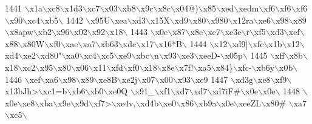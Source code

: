 \begin{DoxyCode}
1441 \textcolor{stringliteral}{\(\backslash\)x1a\(\backslash\)xc8\(\backslash\)x1d3\(\backslash\)xc7\(\backslash\)x03\(\backslash\)xb8\(\backslash\)x9c\(\backslash\)x8c\(\backslash\)x04@)\(\backslash\)x85\(\backslash\)xed\(\backslash\)xedm\(\backslash\)xf6\(\backslash\)xf6\(\backslash\)xf6\(\backslash\)x90\(\backslash\)xc4\(\backslash\)xb5\(\backslash\)}
1442 \textcolor{stringliteral}{\(\backslash\)x95U\(\backslash\)xea\(\backslash\)xd3\(\backslash\)x15X\(\backslash\)xd9\(\backslash\)x80\(\backslash\)x980\(\backslash\)x12ra\(\backslash\)xe6\(\backslash\)x98\(\backslash\)x89\(\backslash\)x8apw\(\backslash\)xb2\(\backslash\)x96\(\backslash\)x02\(\backslash\)x92\(\backslash\)x18\(\backslash\)}
1443 \textcolor{stringliteral}{\(\backslash\)x0e\(\backslash\)x87\(\backslash\)x8c\(\backslash\)xc7\(\backslash\)xe3e\(\backslash\)r\(\backslash\)xf5\(\backslash\)xd3\(\backslash\)xef\(\backslash\)x88\(\backslash\)x80W\(\backslash\)xf0\(\backslash\)xae\(\backslash\)xa7\(\backslash\)xb63\(\backslash\)xdc\(\backslash\)x17\(\backslash\)x16*B\(\backslash\)}
1444 \textcolor{stringliteral}{\(\backslash\)x12\(\backslash\)xd9]\(\backslash\)xfc\(\backslash\)x1b\(\backslash\)x12\(\backslash\)xd4\(\backslash\)xe2\(\backslash\)xd80"\(\backslash\)xa0\(\backslash\)xc4\(\backslash\)xc5\(\backslash\)xe9\(\backslash\)xbc\(\backslash\)n\(\backslash\)x93\(\backslash\)xe3\(\backslash\)xeeD-\(\backslash\)x05p\(\backslash\)}
1445 \textcolor{stringliteral}{\(\backslash\)xff\(\backslash\)x8b\(\backslash\)x18\(\backslash\)xc2\(\backslash\)x95\(\backslash\)x80\(\backslash\)x06\(\backslash\)x11\(\backslash\)xfd\(\backslash\)xf0\(\backslash\)x18\(\backslash\)x8e\(\backslash\)x7f!\(\backslash\)xa5\(\backslash\)x84\}\(\backslash\)xfc-\(\backslash\)xb6y\(\backslash\)x0b\(\backslash\)}
1446 \textcolor{stringliteral}{\(\backslash\)xef\(\backslash\)xa6\(\backslash\)x98\(\backslash\)x89\(\backslash\)xe8B\(\backslash\)xe2j\(\backslash\)x07\(\backslash\)x00\(\backslash\)x93\(\backslash\)xc9%
1447 \textcolor{stringliteral}{\(\backslash\)xd3g\(\backslash\)xe8\(\backslash\)xf9\(\backslash\)x13bJh>\(\backslash\)xc1=b\(\backslash\)xb6\(\backslash\)xb0\(\backslash\)xe0Q \(\backslash\)x91\_\(\backslash\)xf1\(\backslash\)xd7\(\backslash\)xd7\(\backslash\)xd7iF#\(\backslash\)x0e\(\backslash\)x0e\(\backslash\)}
1448 \textcolor{stringliteral}{\(\backslash\)x0e\(\backslash\)xe8\(\backslash\)xba\(\backslash\)x9e\(\backslash\)x9d\(\backslash\)xf7>\(\backslash\)xe4v,\(\backslash\)xd4b\(\backslash\)xe0\(\backslash\)x86\(\backslash\)xb9a\(\backslash\)x0e\(\backslash\)xeeZL\(\backslash\)x80# \(\backslash\)xa7\(\backslash\)xc5\(\backslash\)}
}
\end{DoxyCode}
